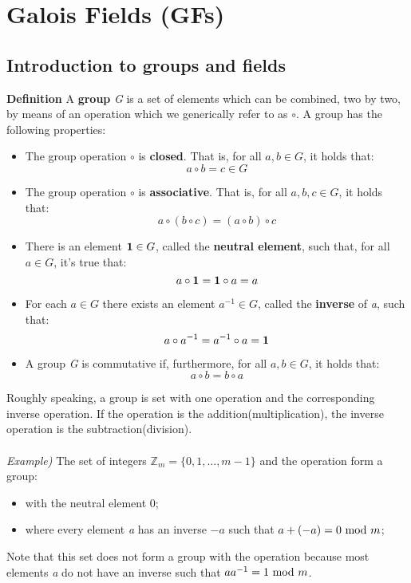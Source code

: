 \newpage
\section{Galois Fields (GFs)}
\subsection{Introduction to groups and fields}
\begin{framed}
\hfill\break\textbf{Definition} A \textbf{group} \textit{G} is a set of elements which can be combined, two by two, by means of an operation which we generically refer to as $\circ$. A group has the following properties:
\begin{itemize}
    \item The group operation $\circ$ is \textbf{closed}. That is, for all $a,b\in G$, it holds that:
    $$a\circ b=c\in G$$
    \item The group operation $\circ$ is \textbf{associative}. That is, for all $a,b,c\in G$, it holds that:
    $$a\circ(b\circ c)=(a\circ b)\circ c$$
    \item There is an element $\textbf{1}\in G$, called the \textbf{neutral element}, such that, for all $a\in G$, it's true that:
    $$a\circ\textbf{1}=\textbf{1}\circ a=a$$
    \item For each $a\in G$ there exists an element $a^{-1}\in G$, called the \textbf{inverse} of \textit{a}, such that:
    $$a\circ a^{-1}=a^{-1}\circ a=\textbf{1}$$
    \item A group \textit{G} is commutative if, furthermore, for all $a,b\in G$, it holds that:
    $$a\circ b=b\circ a$$
\end{itemize}
\end{framed}
Roughly speaking, a group is set with one operation and the corresponding inverse operation. If the operation is the addition(multiplication), the inverse operation is the subtraction(division).\\\\
\textit{Example)} The set of integers $\mathbb{Z}_m=\{0,1,...,m-1\}$ and the operation  form a group:
\begin{itemize}
    \item with the neutral element 0;
    \item where every element \textit{a} has an inverse $-a$ such that $a+(-a)=0\text{ mod } m$;
\end{itemize}
Note that this set does not form a group with the operation  because most elements \textit{a} do not have an inverse such that $aa^{-1}=1\text{ mod } m$.\\\\
